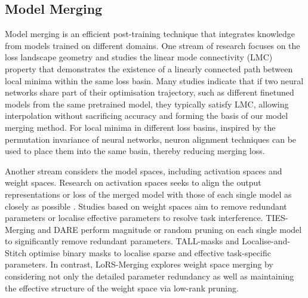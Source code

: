 \subsection{Model Merging}
Model merging \cite{yang2024model,khan2024sok} is an efficient post-training technique that integrates knowledge from models trained on different domains.
One stream of research focuses on the loss landscape geometry \cite{khan2024sok} and studies the linear mode connectivity (LMC) \cite{frankle2020linear,draxler2018essentially} property that demonstrates the existence of a linearly connected path between local minima within the same loss basin.
Many studies \cite{nagarajan2019uniform,izmailov2018averaging,frankle2020linear} indicate that if two neural networks share part of their optimisation trajectory, such as different finetuned models from the same pretrained model, they typically satisfy LMC, allowing interpolation without sacrificing accuracy and forming the basis of our model merging method. 
For local minima in different loss basins, inspired by the permutation invariance \cite{entezarirole} of neural networks, neuron alignment techniques \cite{ainsworthgit,singh2020model,tatro2020optimizing} can be used to place them into the same basin, thereby reducing merging loss.

Another stream considers the model spaces, including activation spaces and weight spaces.
Research on activation spaces seeks to align the output representations or loss of the merged model with those of each single model as closely as possible \cite{yangrepresentation,wei2025modeling,xiong2024multi}. Studies based on weight spaces aim to remove redundant parameters or localise effective parameters to resolve task interference.
TIES-Merging \cite{yadav2024ties} and DARE \cite{yu2024language} perform magnitude or random pruning on each single model to significantly remove redundant parameters.
TALL-masks \cite{wanglocalizing} and Localise-and-Stitch \cite{he2024localize} optimise binary masks to localise sparse and effective task-specific parameters. In contrast, LoRS-Merging explores weight space merging by considering not only the detailed parameter redundancy as well as maintaining the effective structure of the weight space via low-rank pruning.
